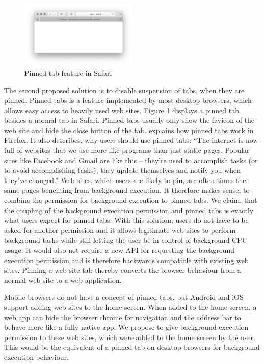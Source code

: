 \documentclass[
	ngerman,
	ruledheaders=section,%
	class=report,%
	thesis={type=bachelor},%
	accentcolor=9c,%
	custommargins=true,%
	marginpar=false,%
	parskip=half-,%
	fontsize=11pt,%
]{tudapub}
\begin{document}
  \begin{figure}
    \centering
    \includegraphics[width=0.5\textwidth]{images/pinned-tab.png}
    \caption{Pinned tab feature in Safari}
    \label{fig:pinned-tab}
  \end{figure}
  
  The second proposed solution is to disable suspension of tabs, when they are pinned. Pinned tabs is a feature implemented by most desktop browsers, which allows easy access to heavily used web sites. Figure \ref{fig:pinned-tab} displays a pinned tab besides a normal tab in Safari. Pinned tabs usually only show the favicon of the web site and hide the close button of the tab. \cite{firefox-pinned-tabs} explains how pinned tabs work in Firefox. It also describes, why users should use pinned tabs: ``The internet is now full of websites that we use more like programs than just static pages. Popular sites like Facebook and Gmail are like this – they're used to accomplish tasks (or to avoid accomplishing tasks), they update themselves and notify you when they've changed.'' Web sites, which users are likely to pin, are often times the same pages benefiting from background execution. It therefore makes sense, to combine the permission for background execution to pinned tabs. We claim, that the coupling of the background execution permission and pinned tabs is exactly what users expect for pinned tabs. With this solution, users do not have to be asked for another permission and it allows legitimate web sites to perform background tasks while still letting the user be in control of background CPU usage. It would also not require a new API for requesting the background execution permission and is therefore backwards compatible with existing web sites. Pinning a web site tab thereby converts the browser behaviour from a normal web site to a web application.

  Mobile browsers do not have a concept of pinned tabs, but Android and iOS support adding web sites to the home screen. When added to the home screen, a web app can hide the browser chrome for navigation and the address bar to behave more like a fully native app. We propose to give background execution permission to these web sites, which were added to the home screen by the user. This would be the equivalent of a pinned tab on desktop browsers for background execution behaviour.
  

  
  \newpage
  \printbibliography[heading=bibnumbered]

   
\end{document}
